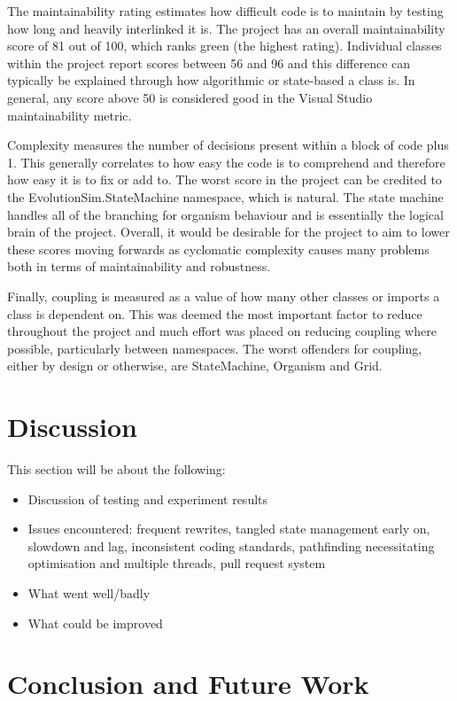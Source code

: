 \documentclass[a4paper, oneside, 11pt]{report}
\begin{document}
The maintainability rating estimates how difficult code is to maintain by testing how long and heavily interlinked it is. The project has an overall maintainability score of 81 out of 100, which ranks green (the highest rating). Individual classes within the project report scores between 56 and 96 and this difference can typically be explained through how algorithmic or state-based a class is. In general, any score above 50 is considered good in the Visual Studio maintainability metric.

Complexity measures the number of decisions present within a block of code plus 1. This generally correlates to how easy the code is to comprehend and therefore how easy it is to fix or add to. The worst score in the project can be credited to the EvolutionSim.StateMachine namespace, which is natural. The state machine handles all of the branching for organism behaviour and is essentially the logical brain of the project. Overall, it would be desirable for the project to aim to lower these scores moving forwards as cyclomatic complexity causes many problems both in terms of maintainability and robustness.

Finally, coupling is measured as a value of how many other classes or imports a class is dependent on. This was deemed the most important factor to reduce throughout the project and much effort was placed on reducing coupling where possible, particularly between namespaces. The worst offenders for coupling, either by design or otherwise, are StateMachine, Organism and Grid. 

\chapter{Discussion}\label{discussion}


This section will be about the following:
\begin{itemize}
	\itemsep0em
	\item Discussion of testing and experiment results
	\item Issues encountered: frequent rewrites, tangled state management early on, slowdown and lag, inconsistent coding standards, pathfinding necessitating optimisation and multiple threads, pull request system 
	\item What went well/badly
	\item What could be improved
\end{itemize} 

\chapter{Conclusion and Future Work}\label{conclusion}
\end{document}
